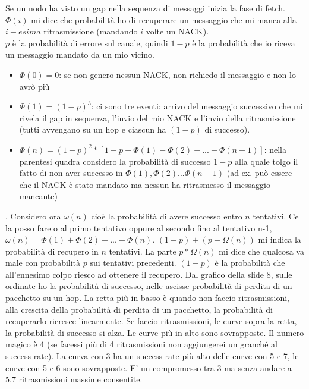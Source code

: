 \documentclass[12pt,italian]{report}
\begin{document}
\bigbreak
Se un nodo ha visto un gap nella sequenza di messaggi inizia la fase di fetch. \\ $\Phi(i)$ mi dice che probabilità ho di recuperare un messaggio che mi manca alla $i-esima$ ritrasmissione (mandando $i$ volte un NACK). \\ $p$ è la probabilità di errore sul canale, quindi $1-p$ è la probabilità che io riceva un messaggio mandato da un mio vicino.
\begin{itemize}
    \item $\Phi(0) = 0$: se non genero nessun NACK, non richiedo il messaggio e non lo avrò più
    \item $\Phi(1) = (1-p)^3$: ci sono tre eventi: arrivo del messaggio successivo che mi rivela il gap in sequenza, l'invio del mio NACK e l'invio della ritrasmissione (tutti avvengano su un hop e ciascun ha $(1-p)$ di successo).
    \item $\Phi(n) = (1-p)^2 * [1-p-\Phi(1)-\Phi(2) - ... - \Phi(n-1)]$: nella parentesi quadra considero la probabilità di successo $1-p$ alla quale tolgo il fatto di non aver successo in $\Phi(1), \Phi(2) ... \Phi(n-1)$ (ad ex. può essere che il NACK è stato mandato ma nessun ha ritrasmesso il messaggio mancante)
\end{itemize}. 
Considero ora $\omega(n)$ cioè la probabilità di avere successo entro $n$ tentativi. Ce la posso fare o al primo tentativo oppure al secondo fino al tentativo n-1, $\omega(n) = \Phi(1) + \Phi(2) + ... + \Phi(n)$. 
\bigbreak
$(1-p) + (p + \Omega(n))$ mi indica la probabilità di recupero in $n$ tentativi. La parte $p*\Omega(n)$ mi dice che qualcosa va male con probabilità $p$ sui tentativi precedenti. $(1-p)$ è la probabilità che all'ennesimo colpo riesco ad ottenere il recupero.
\bigbreak
Dal grafico della slide 8, sulle ordinate ho la probabilità di successo, nelle ascisse probabilità di perdita di un pacchetto su un hop. La retta più in basso è quando non faccio ritrasmissioni, alla crescita della probabilità di perdita di un pacchetto, la probabilità di recuperarlo ricresce linearmente. Se faccio ritrasmissioni, le curve sopra la retta, la probabilità di successo si alza. Le curve più in alto sono sovrapposte. 
\bigbreak
Il numero magico è 4 (se facessi più di 4 ritrasmissioni non aggiungerei un granché al success rate). La curva con 3 ha un success rate più alto delle curve con 5 e 7, le curve con 5 e 6 sono sovrapposte. E' un compromesso tra 3 ma senza andare a 5,7 ritrasmissioni massime consentite. 
\end{document}
